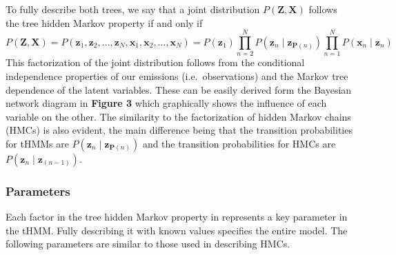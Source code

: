 \documentclass[11pt]{article}
\begin{document}
To fully describe both trees, we say that a joint distribution
\({P}(\bm{Z},\bm{X})\) follows the tree hidden Markov property if and
only if
\[{{P}(\bm{Z},\bm{X}) = P}(\bm{z}_{1},\bm{z}_{2},\ldots,\bm{z}_{N},\bm{x}_{1},\bm{x}_{2},\ldots,\bm{x}_{N}) = {P}(\bm{z}_{1})\prod_{n=2}^{N}{P}(\bm{z}_{n}\mid\bm{z}_{\bm{P}(n)})\prod_{n=1}^{N}{P}(\bm{x}_{n}\mid\bm{z}_{n})\]
This factorization of the joint distribution follows from the
conditional independence properties of our emissions (i.e.~observations)
and the Markov tree dependence of the latent variables. These can be
easily derived form the Bayesian network diagram in \textbf{Figure 3}
which graphically shows the influence of each variable on the other. The
similarity to the factorization of hidden Markov chains (HMCs) is also
evident, the main difference being that the transition probabilities for
tHMMs are \({P}(\bm{z}_{n}\mid\bm{z}_{\bm{P}(n)})\) and the transition
probabilities for HMCs are \({P}(\bm{z}_{n}\mid\bm{z}_{(n-1)})\).

\hypertarget{parameters}{%
\subsubsection{Parameters}\label{parameters}}

Each factor in the tree hidden Markov property in represents a key
parameter in the tHMM. Fully describing it with known values specifies
the entire model. The following parameters are similar to those used in
describing HMCs.
\end{document}
